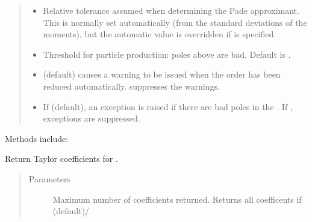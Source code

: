 \documentclass[letterpaper,10pt,english]{sphinxmanual}
\begin{document}
\begin{fulllineitems}
\begin{quote}
\begin{description}
\begin{itemize}
\item {} 
 \textendash{} Relative tolerance assumed when determining the
Pade approximant. This is normally set automatically
(from the standard deviations of the moments), but the
automatic value is overridden if  is specified.

\item {} 
 \textendash{} Threshold for particle production: poles above 
are bad. Default is .

\item {} 
 \textendash{}  (default) causes a warning to be issued
when the order has been reduced automatically. 
suppresses the warnings.

\item {} 
 \textendash{} If  (default), an exception is raised if there
are bad poles in the . If , exceptions are
suppressed.

\end{itemize}

\end{description}\end{quote}

Methods include:

\begin{fulllineitems}
\label{\detokenize{g2tools:g2tools.vacpol.taylor}}
Return Taylor coefficients for .
\begin{quote}\begin{description}
\item[{Parameters}] \leavevmode
{} \textendash{} Maximum number of coefficients returned. Returns
all coefficents if  (default)/

\end{description}\end{quote}

\end{fulllineitems}


\end{fulllineitems}
\end{document}

